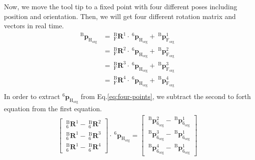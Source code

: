 Now, we move the tool tip to a fixed point with four different poses including position and orientation. Then, we will get four different rotation matrix and vectors in real time. 
\begin{equation}
\begin{split}																									
^\mathrm{B}\!\boldsymbol{p}_\mathrm{H_{org}}&=\  _{\mathrm{F}}^{\mathrm{B}}\mathbf{R}^1 \cdot\ ^\mathrm{6}\!\boldsymbol{p}_\mathrm{H_{org}} +\ ^\mathrm{B}\!\boldsymbol{p}_\mathrm{F_{org}}^1\\
					  						&=\  _{\mathrm{F}}^{\mathrm{B}}\mathbf{R}^2 \cdot\ ^\mathrm{6}\!\boldsymbol{p}_\mathrm{H_{org}} +\ ^\mathrm{B}\!\boldsymbol{p}_\mathrm{F_{org}}^2\\
					  						&=\  _{\mathrm{F}}^{\mathrm{B}}\mathbf{R}^3 \cdot\ ^\mathrm{6}\!\boldsymbol{p}_\mathrm{H_{org}} +\ ^\mathrm{B}\!\boldsymbol{p}_\mathrm{F_{org}}^3\\
					 					 	&=\  _{\mathrm{F}}^{\mathrm{B}}\mathbf{R}^4 \cdot\ ^\mathrm{6}\!\boldsymbol{p}_\mathrm{H_{org}} +\ ^\mathrm{B}\!\boldsymbol{p}_\mathrm{F_{org}}^4\\
\end{split}\label{eq:four-points}
\end{equation}
In order to extract $^\mathrm{6}\!\boldsymbol{p}_\mathrm{H_{org}}$ from Eq.\ref{eq:four-points}, we subtract the second to forth equation from the first equation.
\begin{equation}
\begin{split}	
\begin{bmatrix}
\  _{\mathrm{6}}^{\mathrm{B}}\mathbf{R}^{1} - \  _{\mathrm{6}}^{\mathrm{B}}\mathbf{R}^{2}\\ 
\  _{\mathrm{6}}^{\mathrm{B}}\mathbf{R}^{1} - \  _{\mathrm{6}}^{\mathrm{B}}\mathbf{R}^{3}\\ 
\  _{\mathrm{6}}^{\mathrm{B}}\mathbf{R}^{1} - \  _{\mathrm{6}}^{\mathrm{B}}\mathbf{R}^{4}
\end{bmatrix}
\cdot\ ^\mathrm{6}\!\boldsymbol{p}_\mathrm{H_{org}}
=
\begin{bmatrix}
\ ^\mathrm{B}\!\boldsymbol{p}_\mathrm{6_{org}}^{2} -\ ^\mathrm{B}\!\boldsymbol{p}_\mathrm{6_{org}}^{1} \\ 
\ ^\mathrm{B}\!\boldsymbol{p}_\mathrm{6_{org}}^{3} -\ ^\mathrm{B}\!\boldsymbol{p}_\mathrm{6_{org}}^{1} \\ 
\ ^\mathrm{B}\!\boldsymbol{p}_\mathrm{6_{org}}^{4} -\ ^\mathrm{B}\!\boldsymbol{p}_\mathrm{6_{org}}^{1} 
\end{bmatrix}
\end{split}
\end{equation}
